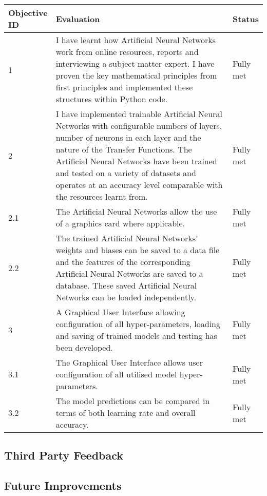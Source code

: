 \documentclass[./project-report/src/latex/project-report.tex]{subfiles}
\begin{document}
\begin{tabular}{|p{0.13\linewidth}|p{0.75\linewidth}|p{0.12\linewidth}|}
    \hline
    \textbf{Objective ID} & \textbf{Evaluation} & \textbf{Status} \\
    \hline
    1 & I have learnt how Artificial Neural Networks work from online resources, reports and interviewing a subject matter expert. I have proven the key mathematical principles from first principles 
        and implemented these structures within Python code. & Fully met \\
    \hline
    2 & I have implemented trainable Artificial Neural Networks with configurable numbers of layers, number of neurons in each layer and the nature of the Transfer Functions. The Artificial Neural 
        Networks have been trained and tested on a variety of datasets and operates at an accuracy level comparable with the resources learnt from. & Fully met \\
    \hline
    2.1 & The Artificial Neural Networks allow the use of a graphics card where applicable. & Fully met \\
    \hline
    2.2 & The trained Artificial Neural Networks' weights and biases can be saved to a data file and the features of the corresponding Artificial Neural Networks are saved to a database. These saved 
          Artificial Neural Networks can be loaded independently. & Fully met \\
    \hline
    3 & A Graphical User Interface allowing configuration of all hyper-parameters, loading and saving of trained models and testing has been developed. & Fully met \\
    \hline
    3.1 & The Graphical User Interface allows user configuration of all utilised model hyper-parameters. & Fully met \\
    \hline
    3.2 & The model predictions can be compared in terms of both learning rate and overall accuracy. & Fully met \\
    \hline
\end{tabular}

\subsection{Third Party Feedback}

\subsection{Future Improvements}
\end{document}
